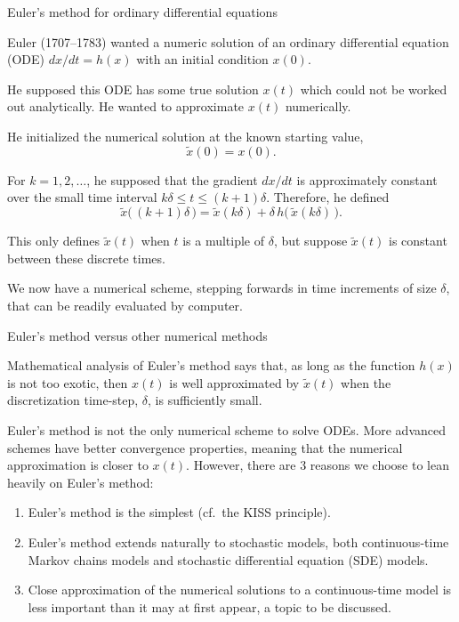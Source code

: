 \begin{frame}[allowframebreaks=0.8]{Euler's method for ordinary differential equations}

  \bi
\item
  Euler (1707--1783) wanted a numeric solution of an ordinary differential equation (ODE)
  $dx/dt = h(x)$
  with an initial condition $x(0)$. 

\item
  He supposed this ODE has some true solution $x(t)$ which could not be worked out analytically. He wanted to approximate $x(t)$ numerically.

\item He initialized the numerical solution at the known starting value, 
  $$\tilde x(0)=x(0).$$

\item For $k=1,2,\dots$, he supposed that the gradient $dx/dt$ is approximately constant over the small time interval $k\delta\le t\le (k+1)\delta$. 
  Therefore, he defined
  $$\tilde x\big( \,(k+1)\delta\,\big) = \tilde x( k\delta) + \delta \, h\big(\, \tilde x(k\delta)\,\big).$$

\item This only defines $\tilde x(t)$ when $t$ is a multiple of $\delta$, but suppose $\tilde x(t)$ is constant between these discrete times.

\item We now have a numerical scheme, stepping forwards in time increments of size $\delta$, that can be readily evaluated by computer.

  \ei

\end{frame}

\begin{frame}{Euler's method versus other numerical methods}
  \bi
\item Mathematical analysis of Euler's method says that, as long as the function $h(x)$ is not too exotic, then $x(t)$ is well approximated by $\tilde x(t)$  when the discretization time-step, $\delta$, is sufficiently small.
\item Euler's method is not the only numerical scheme to solve ODEs. More advanced schemes have better convergence properties, meaning that the numerical approximation is closer to $x(t)$. However, there are 3 reasons we choose to lean heavily on Euler's method:
  \begin{enumerate}
  \item Euler's method is the simplest (cf.\ the KISS principle).
  \item Euler's method extends naturally to stochastic models, both continuous-time Markov chains models and stochastic differential equation (SDE) models.
  \item Close approximation of the numerical solutions to a continuous-time model is less important than it may at first appear, a topic to be discussed.
  \end{enumerate}
  \ei
\end{frame}

